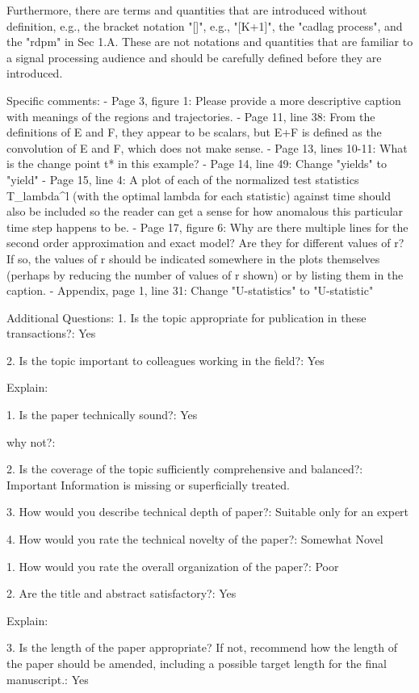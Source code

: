 Furthermore, there are terms and quantities that are introduced
without definition, e.g., the bracket notation "[]", e.g., "[K+1]",
the "cadlag process", and the "rdpm" in Sec 1.A. These are not
notations and quantities that are familiar to a signal processing
audience and should be carefully defined before they are introduced.

Specific comments:
- Page 3, figure 1: Please provide a more descriptive caption with
meanings of the regions and trajectories.
- Page 11, line 38: From the definitions of E and F, they appear to be
scalars, but E+F is defined as the convolution of E and F, which does
not make sense.
- Page 13, lines 10-11: What is the change point t* in this example?
- Page 14, line 49: Change "yields" to "yield"
- Page 15, line 4: A plot of each of the normalized test statistics
T_lambda^l (with the optimal lambda for each statistic) against time
should also be included so the reader can get a sense for how
anomalous this particular time step happens to be.
- Page 17, figure 6: Why are there multiple lines for the second order
approximation and exact model? Are they for different values of r? If
so, the values of r should be indicated somewhere in the plots
themselves (perhaps by reducing the number of values of r shown) or by
listing them in the caption.
- Appendix, page 1, line 31: Change "U-statistics" to "U-statistic"


Additional Questions:
1. Is the topic appropriate for publication in these transactions?: Yes

2. Is the topic important to colleagues working in the field?: Yes

Explain:  

1. Is the paper technically sound?: Yes

why not?: 

2. Is the coverage of the topic sufficiently comprehensive and
balanced?: Important Information is missing or superficially treated.

3. How would you describe technical depth of paper?: Suitable only for an expert

4. How would you rate the technical novelty of the paper?: Somewhat Novel

1. How would you rate the overall organization of the paper?: Poor

2. Are the title and abstract satisfactory?: Yes

Explain: 

3. Is the length of the paper appropriate? If not, recommend how the
length of the paper should be amended, including a possible target
length for the final manuscript.: Yes

